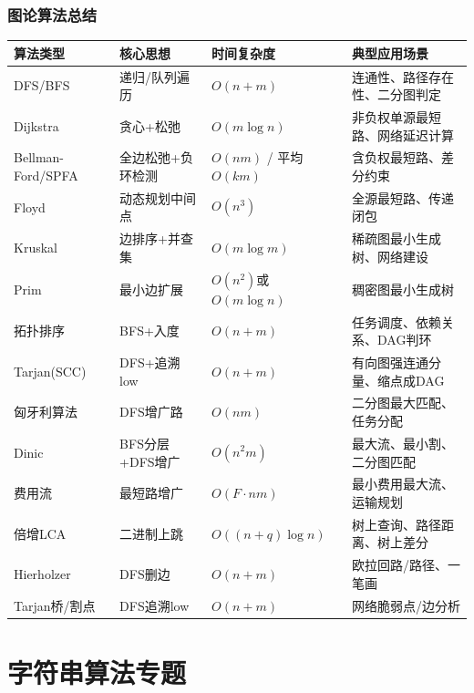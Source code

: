 \documentclass[12pt,a4paper]{ctexart}
\begin{document}
		\section{图论算法总结}
		\begin{table}[h]
			\centering
			\begin{tabularx}{\textwidth}{|l|p{4cm}|l|X|}
				\hline
				算法类型 & 核心思想 & 时间复杂度 & 典型应用场景 \\
				\hline
				DFS/BFS & 递归/队列遍历 & \(O(n+m)\) & 连通性、路径存在性、二分图判定 \\
				\hline
				Dijkstra & 贪心+松弛 & \(O(m\log n)\) & 非负权单源最短路、网络延迟计算 \\
				\hline
				Bellman-Ford/SPFA & 全边松弛+负环检测 & \(O(nm)\) / 平均\(O(km)\) & 含负权最短路、差分约束 \\
				\hline
				Floyd & 动态规划中间点 & \(O(n^3)\) & 全源最短路、传递闭包 \\
				\hline
				Kruskal & 边排序+并查集 & \(O(m\log m)\) & 稀疏图最小生成树、网络建设 \\
				\hline
				Prim & 最小边扩展 & \(O(n^2)\)或\(O(m\log n)\) & 稠密图最小生成树 \\
				\hline
				拓扑排序 & BFS+入度 & \(O(n+m)\) & 任务调度、依赖关系、DAG判环 \\
				\hline
				Tarjan(SCC) & DFS+追溯low & \(O(n+m)\) & 有向图强连通分量、缩点成DAG \\
				\hline
				匈牙利算法 & DFS增广路 & \(O(nm)\) & 二分图最大匹配、任务分配 \\
				\hline
				Dinic & BFS分层+DFS增广 & \(O(n^2 m)\) & 最大流、最小割、二分图匹配 \\
				\hline
				费用流 & 最短路增广 & \(O(F \cdot nm)\) & 最小费用最大流、运输规划 \\
				\hline
				倍增LCA & 二进制上跳 & \(O((n+q)\log n)\) & 树上查询、路径距离、树上差分 \\
				\hline
				Hierholzer & DFS删边 & \(O(n+m)\) & 欧拉回路/路径、一笔画 \\
				\hline
				Tarjan桥/割点 & DFS追溯low & \(O(n+m)\) & 网络脆弱点/边分析 \\
				\hline
			\end{tabularx}
		\end{table}
		\newpage
		
		\part{字符串算法专题}
		
\end{document}
